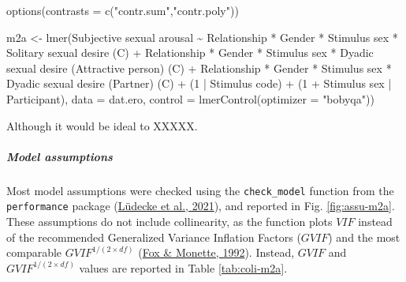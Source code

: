 \documentclass[
  bookmarksnumbered]{article}
\newenvironment{Shaded}{\begin{snugshade}}{\end{snugshade}}
\newcommand{\AttributeTok}[1]{\textcolor[rgb]{0.80,0.80,0.80}{#1}}
\newcommand{\DecValTok}[1]{\textcolor[rgb]{0.86,0.86,0.80}{#1}}
\newcommand{\FunctionTok}[1]{\textcolor[rgb]{0.94,0.94,0.56}{#1}}
\newcommand{\NormalTok}[1]{\textcolor[rgb]{0.80,0.80,0.80}{#1}}
\newcommand{\OtherTok}[1]{\textcolor[rgb]{0.94,0.94,0.56}{#1}}
\newcommand{\SpecialCharTok}[1]{\textcolor[rgb]{0.86,0.64,0.64}{#1}}
\newcommand{\StringTok}[1]{\textcolor[rgb]{0.80,0.58,0.58}{#1}}
\begin{document}
\begin{Shaded}
\begin{Highlighting}[]
\FunctionTok{options}\NormalTok{(}\AttributeTok{contrasts =} \FunctionTok{c}\NormalTok{(}\StringTok{"contr.sum"}\NormalTok{,}\StringTok{"contr.poly"}\NormalTok{))}

\NormalTok{m2a }\OtherTok{\textless{}{-}} \FunctionTok{lmer}\NormalTok{(}\StringTok{\textasciigrave{}}\AttributeTok{Subjective sexual arousal}\StringTok{\textasciigrave{}} \SpecialCharTok{\textasciitilde{}}
\NormalTok{            Relationship }\SpecialCharTok{*}\NormalTok{ Gender }\SpecialCharTok{*} \StringTok{\textasciigrave{}}\AttributeTok{Stimulus sex}\StringTok{\textasciigrave{}} \SpecialCharTok{*} \StringTok{\textasciigrave{}}\AttributeTok{Solitary sexual desire (C)}\StringTok{\textasciigrave{}} \SpecialCharTok{+}
\NormalTok{            Relationship }\SpecialCharTok{*}\NormalTok{ Gender }\SpecialCharTok{*} \StringTok{\textasciigrave{}}\AttributeTok{Stimulus sex}\StringTok{\textasciigrave{}} \SpecialCharTok{*} \StringTok{\textasciigrave{}}\AttributeTok{Dyadic sexual desire (Attractive person) (C)}\StringTok{\textasciigrave{}} \SpecialCharTok{+}
\NormalTok{            Relationship }\SpecialCharTok{*}\NormalTok{ Gender }\SpecialCharTok{*} \StringTok{\textasciigrave{}}\AttributeTok{Stimulus sex}\StringTok{\textasciigrave{}} \SpecialCharTok{*} \StringTok{\textasciigrave{}}\AttributeTok{Dyadic sexual desire (Partner) (C)}\StringTok{\textasciigrave{}} \SpecialCharTok{+}
\NormalTok{            (}\DecValTok{1} \SpecialCharTok{|} \StringTok{\textasciigrave{}}\AttributeTok{Stimulus code}\StringTok{\textasciigrave{}}\NormalTok{) }\SpecialCharTok{+}
\NormalTok{            (}\DecValTok{1} \SpecialCharTok{+} \StringTok{\textasciigrave{}}\AttributeTok{Stimulus sex}\StringTok{\textasciigrave{}} \SpecialCharTok{|}\NormalTok{ Participant),}
           \AttributeTok{data =}\NormalTok{ dat.ero,}
           \AttributeTok{control =} \FunctionTok{lmerControl}\NormalTok{(}\AttributeTok{optimizer =} \StringTok{"bobyqa"}\NormalTok{))}
\end{Highlighting}
\end{Shaded}

Although it would be ideal to XXXXX.

\hypertarget{model-assumptions-1}{%
\subparagraph{Model assumptions}\label{model-assumptions-1}}

Most model assumptions were checked using the \texttt{check\_model} function from the \texttt{performance} package (\protect\hyperlink{ref-ludecke2021}{Lüdecke et al., 2021}), and reported in Fig. \ref{fig:assu-m2a}. These assumptions do not include collinearity, as the function plots \(VIF\) instead of the recommended Generalized Variance Inflation Factors (\(GVIF\)) and the most comparable \(GVIF^{{1}/{(2 \times df)}}\) (\protect\hyperlink{ref-fox1992}{Fox \& Monette, 1992}). Instead, \(GVIF\) and \(GVIF^{{1}/{(2 \times df)}}\) values are reported in Table \ref{tab:coli-m2a}.
\end{document}
